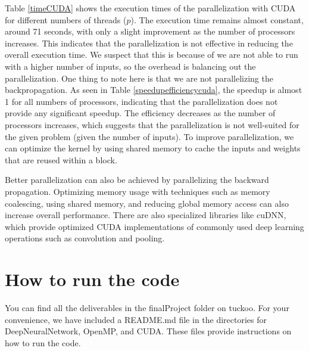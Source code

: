 \documentclass[11pt]{article}
\begin{document}
Table \ref{timeCUDA} shows the execution times of the parallelization with CUDA for different numbers of threads ($p$). The execution time remains almost constant, around 71 seconds, with only a slight improvement as the number of processors increases. This indicates that the parallelization is not effective in reducing the overall execution time. We suspect that this is because of we are not able to run with a higher number of inputs, so the overhead is balancing out the parallelization. One thing to note here is that we are not parallelizing the backpropagation. As seen in Table \ref{speedupefficiencycuda}, the speedup is almost 1 for all numbers of processors, indicating that the parallelization does not provide any significant speedup. The efficiency decreases as the number of processors increases, which suggests that the parallelization is not well-suited for the given problem (given the number of inputs). To improve parallelization, we can optimize the kernel by using shared memory to cache the inputs and weights that are reused within a block. 

\bigskip

Better parallelization can also be achieved by parallelizing the backward propagation. Optimizing memory usage with techniques such as  memory coalescing, using shared memory, and reducing global memory access can also increase overall performance. There are also specialized libraries like cuDNN, which provide optimized CUDA implementations of commonly used deep learning operations such as convolution and pooling.





\clearpage

\section{How to run the code}
You can find all the deliverables in the finalProject folder on tuckoo. For your convenience, we have included a README.md file in the directories for DeepNeuralNetwork, OpenMP, and CUDA. These files provide instructions on how to run the code.
\end{document}
